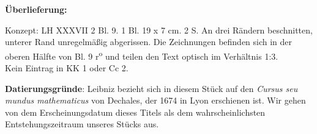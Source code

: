       
               
                \begin{ledgroupsized}[r]{120mm}
                \footnotesize 
                \pstart                
                \noindent\textbf{\"{U}berlieferung:}   
                \pend
                \end{ledgroupsized}
            
              
                            \begin{ledgroupsized}[r]{114mm}
                            \footnotesize 
                            \pstart \parindent -6mm
                            Konzept: LH XXXVII 2 Bl. 9. 1 Bl. 19 x 7 cm. 2 S. An drei R\"{a}ndern beschnitten, unterer Rand unregelm\"{a}ßig abgerissen. Die Zeichnungen befinden sich in der oberen H\"{a}lfte von Bl. 9 r\textsuperscript{o} und teilen den Text optisch im Verh\"{a}ltnis 1:3.\\Kein Eintrag in KK 1 oder Cc 2. \pend
                            \end{ledgroupsized}
                \vspace*{5mm}
                \begin{ledgroup}
                \footnotesize 
                \pstart
            \noindent\footnotesize{\textbf{Datierungsgr\"{u}nde}: Leibniz bezieht sich in diesem St\"{u}ck auf den \cite{00124}\textit{Cursus seu mundus mathematicus} von Dechales, der 1674 in Lyon\protect{} erschienen ist. Wir gehen von dem Erscheinungsdatum dieses Titels als dem wahrscheinlichsten Entstehungszeitraum unseres St\"{u}cks aus.}
                \pend
                \end{ledgroup}
            
